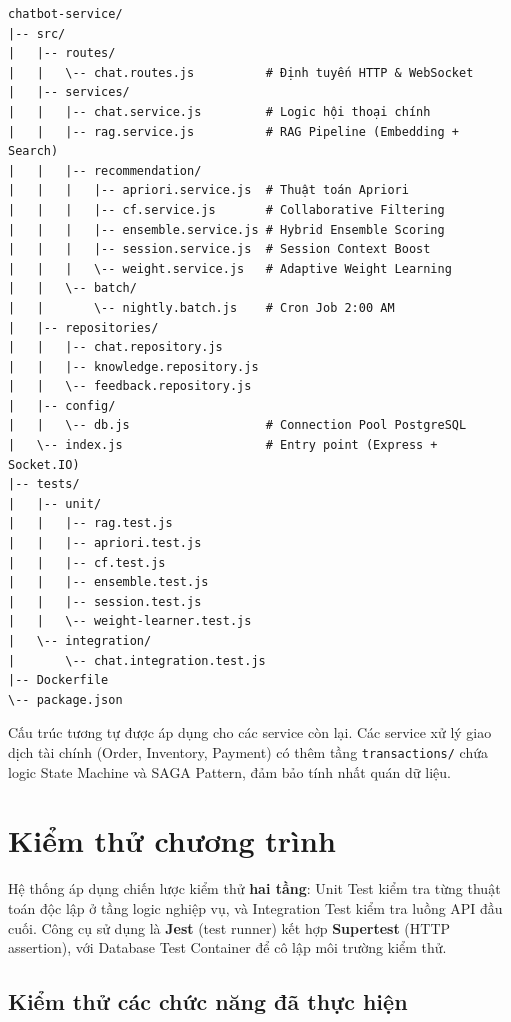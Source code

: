 \documentclass[12pt,a4paper]{report}
\begin{document}
\begin{verbatim}
chatbot-service/
|-- src/
|   |-- routes/
|   |   \-- chat.routes.js          # Định tuyến HTTP & WebSocket
|   |-- services/
|   |   |-- chat.service.js         # Logic hội thoại chính
|   |   |-- rag.service.js          # RAG Pipeline (Embedding + Search)
|   |   |-- recommendation/
|   |   |   |-- apriori.service.js  # Thuật toán Apriori
|   |   |   |-- cf.service.js       # Collaborative Filtering
|   |   |   |-- ensemble.service.js # Hybrid Ensemble Scoring
|   |   |   |-- session.service.js  # Session Context Boost
|   |   |   \-- weight.service.js   # Adaptive Weight Learning
|   |   \-- batch/
|   |       \-- nightly.batch.js    # Cron Job 2:00 AM
|   |-- repositories/
|   |   |-- chat.repository.js
|   |   |-- knowledge.repository.js
|   |   \-- feedback.repository.js
|   |-- config/
|   |   \-- db.js                   # Connection Pool PostgreSQL
|   \-- index.js                    # Entry point (Express + Socket.IO)
|-- tests/
|   |-- unit/
|   |   |-- rag.test.js
|   |   |-- apriori.test.js
|   |   |-- cf.test.js
|   |   |-- ensemble.test.js
|   |   |-- session.test.js
|   |   \-- weight-learner.test.js
|   \-- integration/
|       \-- chat.integration.test.js
|-- Dockerfile
\-- package.json
\end{verbatim}

Cấu trúc tương tự được áp dụng cho các service còn lại. Các service xử lý giao dịch tài chính (Order, Inventory, Payment) có thêm tầng \texttt{transactions/} chứa logic State Machine và SAGA Pattern, đảm bảo tính nhất quán dữ liệu.

\section{Kiểm thử chương trình}

Hệ thống áp dụng chiến lược kiểm thử \textbf{hai tầng}: Unit Test kiểm tra từng thuật toán độc lập ở tầng logic nghiệp vụ, và Integration Test kiểm tra luồng API đầu cuối. Công cụ sử dụng là \textbf{Jest} (test runner) kết hợp \textbf{Supertest} (HTTP assertion), với Database Test Container để cô lập môi trường kiểm thử.

\subsection{Kiểm thử các chức năng đã thực hiện}
\end{document}
